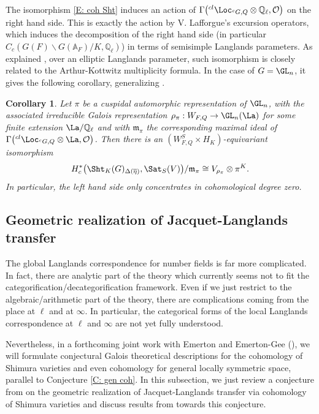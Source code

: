 \documentclass[11pt]{amsart}
\newtheorem{cor}[thm]{Corollary}
\theoremstyle{definition}
\theoremstyle{definition}
\theoremstyle{definition}
\numberwithin{equation}{section}
\newcommand{\frakm}{{\mathfrak m}}
\newcommand{\bA}{{\mathbb A}}
\newcommand{\bQ}{{\mathbb Q}}
\newcommand{\mO}{{\mathcal O}}
\begin{document}
The isomorphism \eqref{E: coh Sht} induces an action of $\Gamma\big({}^{cl}\Loc_{{}^cG,Q}\otimes\bQ_\ell,\mO\big)$ on the right hand side. This is exactly the action by V. Lafforgue's excursion operators, which induces the decomposition of the right hand side (in particular $C_c(G(F)\backslash G(\bA_F)/K, \bQ_\ell)$) in terms of semisimple Langlands parameters. As explained \cite{Lafforgue-Zhu-Elliptic}, over an elliptic Langlands parameter, such isomorphism is closely related to the Arthur-Kottwitz multiplicity formula.  In the case of $G=\GL_n$,  it gives the following corollary, generalizing \cite{Lafforgue-GLn}.
\begin{cor}
Let $\pi$ be a cuspidal automorphic representation of $\GL_n$, with the associated irreducible Galois representation $\rho_\pi: W_{F,Q}\to \GL_n(\La)$ for some finite extension $\La/\bQ_\ell$ and with $\frakm_\pi$ the corresponding maximal ideal of $\Gamma\big({}^{cl}\Loc_{{}^cG,Q}\otimes\La,\mO\big)$. Then there is an $(W_{F,Q}^S\times H_K)$-equivariant isomorphism
\[
H^*_c\big(\Sht_K(G)_{\Delta(\overline\eta)}, \Sat_S(V)\big)/\frakm_\pi\cong  V_{\rho_\pi}\otimes \pi^K.
\]
In particular, the left hand side only concentrates in cohomological degree zero.
\end{cor}

\subsection{Geometric realization of Jacquet-Langlands transfer}\label{geometric JL}
The global Langlands correspondence for number fields is far more complicated. In fact, there are analytic part of the theory which currently seems not to fit the categorification/decategorification framework. Even if we just restrict to the algebraic/arithmetic part of the theory, there are complications coming from the place at $\ell$ and at $\infty$. In particular, the categorical forms of the local Langlands correspondence at $\ell$ and $\infty$ are not yet fully understood.

Nevertheless, in a forthcoming joint work with Emerton and Emerton-Gee (\cite{Emerton-Zhu, Emerton-Gee-Zhu}), we will formulate conjectural Galois theoretical descriptions for the cohomology of Shimura varieties and even cohomology for general locally symmetric space, parallel to Conjecture \ref{C: gen coh}. In this subsection, we just review a conjecture from \cite{Zhu-Conjecture} on the geometric realization of Jacquet-Langlands transfer via cohomology of Shimura varieties and discuss results from \cite{Xiao-Zhu-Cycle, Hemo-Zhu-Unipotent} towards this conjecture. 
\end{document}
